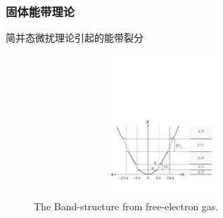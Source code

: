 \documentclass[cjk,slidestop,compress,mathserif,blue]{beamer}
\begin{document}
\frame
{
\frametitle{固体能带理论}
简并态微扰理论引起的能带裂分
\begin{figure}[h!]
\centering
\includegraphics[height=2.1in,width=3.8in,viewport=10 90 570 380,clip]{Figures/Band_Gap.pdf}
\caption{\small \textrm{The Band-structure from free-electron gas.}}%
\label{Band-Structure-1}
\end{figure} 
}
\end{document}
